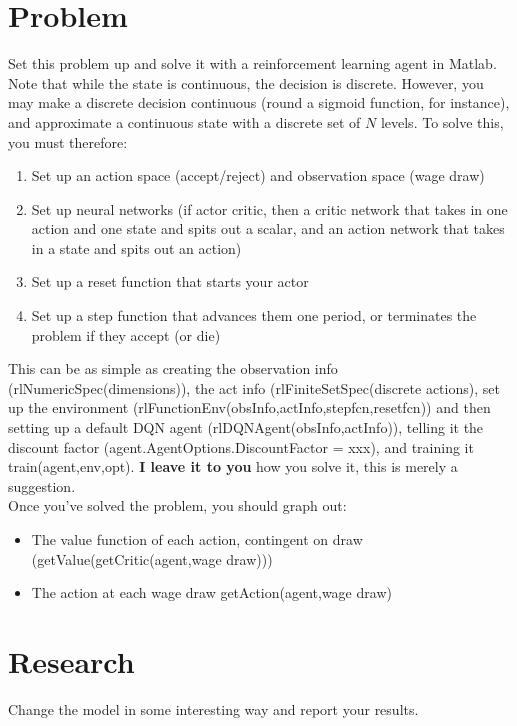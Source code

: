 \documentclass[11pt]{article}
\begin{document}
\section{Problem}
Set this problem up and solve it with a reinforcement learning agent in Matlab.  Note that while the state is continuous, the decision is discrete.  However, you may make a discrete decision continuous (round a sigmoid function, for instance), and approximate a continuous state with a discrete set of $N$ levels.  To solve this, you must therefore:
\begin{enumerate}
\item Set up an action space (accept/reject) and observation space (wage draw)
\item Set up neural networks (if actor critic, then a critic network that takes in one action and one state and spits out a scalar, and an action network that takes in a state and spits out an action)
\item Set up a reset function that starts your actor
\item Set up a step function that advances them one period, or terminates the problem if they accept (or die)
\end{enumerate}
This can be as simple as creating the observation info (rlNumericSpec(dimensions)), the act info (rlFiniteSetSpec(discrete actions), set up the environment (rlFunctionEnv(obsInfo,actInfo,stepfcn,resetfcn)) and then setting up a default DQN agent (rlDQNAgent(obsInfo,actInfo)), telling it the discount factor (agent.AgentOptions.DiscountFactor = xxx), and training it train(agent,env,opt).  \textbf{I leave it to you} how you solve it, this is merely a suggestion.\\
 Once you've solved the problem, you should graph out:
 \begin{itemize}
 \item The value function of each action, contingent on draw (getValue(getCritic(agent,wage draw)))
 \item The action at each wage draw getAction(agent,wage draw)
 \end{itemize}
 
 \section{Research}
 Change the model in some interesting way and report your results.
\end{document}
